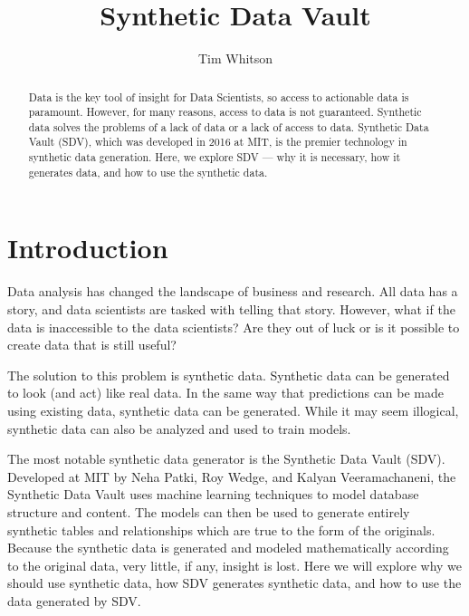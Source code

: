 
\title{Synthetic Data Vault}

\author{Tim Whitson}

\renewcommand{\shortauthors}{T. Whitson}

\begin{abstract}
Data is the key tool of insight for Data Scientists, so access to
actionable data is paramount. However, for many reasons, access to data is
not guaranteed. Synthetic data solves the problems of a lack of data or a
lack of access to data. Synthetic Data Vault (SDV), which was developed in
2016 at MIT, is the premier technology in synthetic data generation. Here,
we explore SDV --- why it is necessary, how it generates data, and how to
use the synthetic data.
\end{abstract}


\maketitle

\section{Introduction}

Data analysis has changed the landscape of business and research. All data
has a story, and data scientists are tasked with telling that story. However,
what if the data is inaccessible to the data scientists? Are they out of
luck or is it possible to create data that is still useful?

The solution to this problem is synthetic data. Synthetic data can be generated
to look (and act) like real data. In the same way that predictions can be
made using existing data, synthetic data can be generated. While it may seem
illogical, synthetic data can also be analyzed and used to train models.

The most notable synthetic data generator is the Synthetic Data Vault
(SDV). Developed at MIT by Neha Patki, Roy Wedge, and Kalyan Veeramachaneni,
the Synthetic Data Vault uses machine learning techniques to model database
structure and content. The models can then be used to generate entirely
synthetic tables and relationships which are true to the form of the
originals. Because the synthetic data is generated and modeled mathematically
according to the original data, very little, if any, insight is lost. Here
we will explore why we should use synthetic data, how SDV generates synthetic
data, and how to use the data generated by SDV.\cite{patki-sdv}

